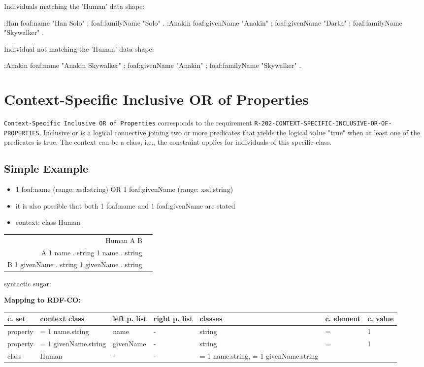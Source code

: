 \documentclass{llncs}
\newcommand{\ms}[1]{\texttt{#1}}
\newenvironment{gcotable}{
  \scriptsize
  \sffamily
  \vspace{0cm}
	\begin{center}
	\textbf{\vspace{0.4cm}Mapping to RDF-CO:} \\
  \begin{tabular}{l|l|l|l|l|l|l}
	\hline
  \textbf{c. set} & \textbf{context class} & \textbf{left p. list} & \textbf{right p. list} & \textbf{classes} & \textbf{c. element} & \textbf{c. value} \\
  \hline

}{
  \hline
  \end{tabular}
	\end{center}
}
\newenvironment{DL}{
\vspace{0cm}
	\begin{center}
  \begin{tabular}{r l}

}{
  \end{tabular}
	\end{center}
}
\begin{document}
Individuals matching the 'Human' data shape:

\begin{ex}
:Han
    foaf:name "Han Solo" ;
    foaf:familyName "Solo" .
:Anakin
    foaf:givenName "Anakin" ;
    foaf:givenName "Darth" ;
    foaf:familyName "Skywalker" .
\end{ex}

Individual not matching the 'Human' data shape:

\begin{ex}
:Anakin
    foaf:name "Anakin Skywalker" ;
    foaf:givenName "Anakin" ;
    foaf:familyName "Skywalker" .
\end{ex}

\section{Context-Specific Inclusive OR of Properties}

\ms{Context-Specific Inclusive OR of Properties} corresponds to the requirement
\ms{R-202-CONTEXT-SPECIFIC-INCLUSIVE-OR-OF-PROPERTIES}.
Inclusive or is a logical connective joining two or more predicates that yields the logical value "true" when at least one of the predicates is true.
The context can be a class, i.e., the constraint applies for individuals of this specific class.

\subsection{Simple Example}

\begin{itemize}
	\item 1 foaf:name (range: xsd:string) OR 1 foaf:givenName (range: xsd:string)
	\item it is also possible that both 1 foaf:name and 1 foaf:givenName are stated
	\item context: class Human
\end{itemize}

\begin{DL}
Human  A  B \\
A   1 name . string   1 name . string \\
B   1 givenName . string   1 givenName . string \\
\end{DL}

syntactic sugar:
\begin{gcotable}
property & = 1 name.string & name & - & string & = & 1 \\
property & = 1 givenName.string & givenName & - & string & = & 1 \\
class & Human & - & - & = 1 name.string, = 1 givenName.string &  \\
\end{gcotable}
\end{document}
